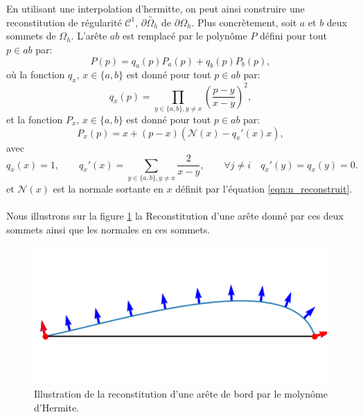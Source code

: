 En utilisant une interpolation d'hermitte, on peut ainsi construire une reconstitution de régularité $\mathcal{C}^1$, $\partial\widetilde{\Omega_h}$ de $\partial\Omega_h$. Plus concrètement, soit $a$ et $b$ deux sommets de $\Omega_h$. L'arête $ab$ est remplacé par le polynôme $P$ défini pour tout $p\in ab$ par:
\[P(p) = q_a(p)P_a(p)+q_b(p)P_b(p),\]
où la fonction $q_x$, $x\in\{a, b\}$ est donné pour tout $p\in ab$ par:
\[q_x(p) = \prod_{y\in\{a,b\}, y\neq x} \left(\frac{p - y}{x - y}\right)^2,\]
et la fonction $P_x$, $x\in\{a, b\}$ est donné pour tout $p\in ab$ par:
\[P_x(p) = x + (p - x) \left(\mathcal{N}(x) - q_x'(x)x\right),\]
avec
\[q_x(x)=1,\quad\quad
q_x'(x)=\sum_{y\in\{a,b\}, y\neq x}\frac{2}{x - y},\quad\quad
\forall j \neq i \quad q_x'(y) = q_x(y) = 0.
\]
et $\mathcal{N}(x)$ est la normale sortante en $x$ définit par l'équation \eqref{eqn:n_reconstruit}.\\\\
Nous illustrons sur la figure \ref{fig:hermite} la Reconstitution d'une arête donné par ces deux sommets ainsi que les normales en ces sommets.


\begin{figure}[!h]
\centering
\includegraphics[scale=0.8]{images/hermite.pdf}
\caption{Illustration de la reconstitution d'une arête de bord par le molynôme d'Hermite.}
\label{fig:hermite}
\end{figure}

